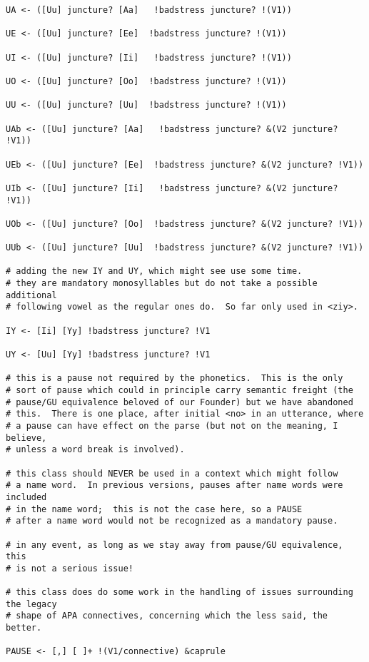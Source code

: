 \documentclass[12pt]{book}
\begin{document}
{\begin{verbatim}
UA <- ([Uu] juncture? [Aa]   !badstress juncture? !(V1))  

UE <- ([Uu] juncture? [Ee]  !badstress juncture? !(V1))  

UI <- ([Uu] juncture? [Ii]   !badstress juncture? !(V1))  

UO <- ([Uu] juncture? [Oo]  !badstress juncture? !(V1))  

UU <- ([Uu] juncture? [Uu]  !badstress juncture? !(V1)) 

UAb <- ([Uu] juncture? [Aa]   !badstress juncture? &(V2 juncture? !V1))  

UEb <- ([Uu] juncture? [Ee]  !badstress juncture? &(V2 juncture? !V1))  

UIb <- ([Uu] juncture? [Ii]   !badstress juncture? &(V2 juncture? !V1))  

UOb <- ([Uu] juncture? [Oo]  !badstress juncture? &(V2 juncture? !V1))  

UUb <- ([Uu] juncture? [Uu]  !badstress juncture? &(V2 juncture? !V1))   

# adding the new IY and UY, which might see use some time.
# they are mandatory monosyllables but do not take a possible additional
# following vowel as the regular ones do.  So far only used in <ziy>.

IY <- [Ii] [Yy] !badstress juncture? !V1

UY <- [Uu] [Yy] !badstress juncture? !V1

# this is a pause not required by the phonetics.  This is the only
# sort of pause which could in principle carry semantic freight (the
# pause/GU equivalence beloved of our Founder) but we have abandoned
# this.  There is one place, after initial <no> in an utterance, where
# a pause can have effect on the parse (but not on the meaning, I believe, 
# unless a word break is involved).

# this class should NEVER be used in a context which might follow
# a name word.  In previous versions, pauses after name words were included
# in the name word;  this is not the case here, so a PAUSE
# after a name word would not be recognized as a mandatory pause.

# in any event, as long as we stay away from pause/GU equivalence, this
# is not a serious issue!

# this class does do some work in the handling of issues surrounding the legacy
# shape of APA connectives, concerning which the less said, the better.

PAUSE <- [,] [ ]+ !(V1/connective) &caprule


\end{verbatim}}
\end{document}
